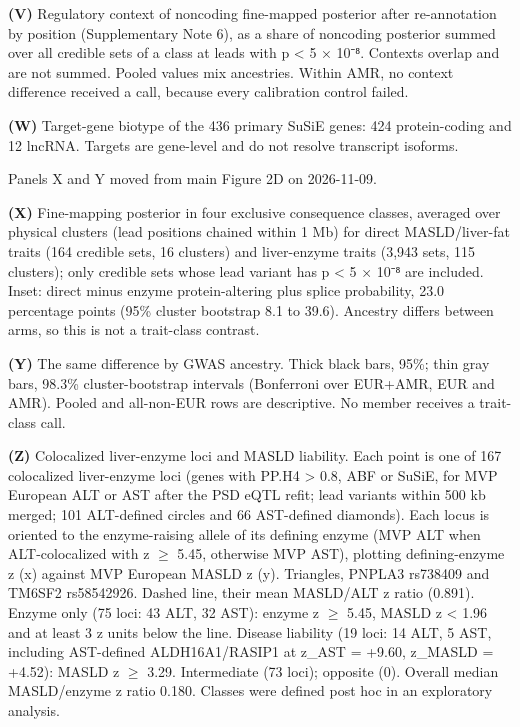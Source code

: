 \textbf{(V)} Regulatory context of noncoding fine-mapped posterior after re-annotation by position (Supplementary Note 6), as a share of noncoding posterior summed over all credible sets of a class at leads with p \textless{} 5 × 10⁻⁸. Contexts overlap and are not summed. Pooled values mix ancestries. Within AMR, no context difference received a call, because every calibration control failed.

\textbf{(W)} Target-gene biotype of the 436 primary SuSiE genes: 424 protein-coding and 12 lncRNA. Targets are gene-level and do not resolve transcript isoforms.

Panels X and Y moved from main Figure 2D on 2026-11-09.

\textbf{(X)} Fine-mapping posterior in four exclusive consequence classes, averaged over physical clusters (lead positions chained within 1 Mb) for direct MASLD/liver-fat traits (164 credible sets, 16 clusters) and liver-enzyme traits (3,943 sets, 115 clusters); only credible sets whose lead variant has p \textless{} 5 × 10⁻⁸ are included. Inset: direct minus enzyme protein-altering plus splice probability, 23.0 percentage points (95\% cluster bootstrap 8.1 to 39.6). Ancestry differs between arms, so this is not a trait-class contrast.

\textbf{(Y)} The same difference by GWAS ancestry. Thick black bars, 95\%; thin gray bars, 98.3\% cluster-bootstrap intervals (Bonferroni over EUR+AMR, EUR and AMR). Pooled and all-non-EUR rows are descriptive. No member receives a trait-class call.

\textbf{(Z)} Colocalized liver-enzyme loci and MASLD liability. Each point is one of 167 colocalized liver-enzyme loci (genes with PP.H4 \textgreater{} 0.8, ABF or SuSiE, for MVP European ALT or AST after the PSD eQTL refit; lead variants within 500 kb merged; 101 ALT-defined circles and 66 AST-defined diamonds). Each locus is oriented to the enzyme-raising allele of its defining enzyme (MVP ALT when ALT-colocalized with \textbar z\textbar{} $\ge$ 5.45, otherwise MVP AST), plotting defining-enzyme z (x) against MVP European MASLD z (y). Triangles, PNPLA3 rs738409 and TM6SF2 rs58542926. Dashed line, their mean MASLD/ALT z ratio (0.891). Enzyme only (75 loci: 43 ALT, 32 AST): enzyme z $\ge$ 5.45, \textbar MASLD z\textbar{} \textless{} 1.96 and at least 3 z units below the line. Disease liability (19 loci: 14 ALT, 5 AST, including AST-defined ALDH16A1/RASIP1 at z\_AST = +9.60, z\_MASLD = +4.52): MASLD z $\ge$ 3.29. Intermediate (73 loci); opposite (0). Overall median MASLD/enzyme z ratio 0.180. Classes were defined post hoc in an exploratory analysis.

